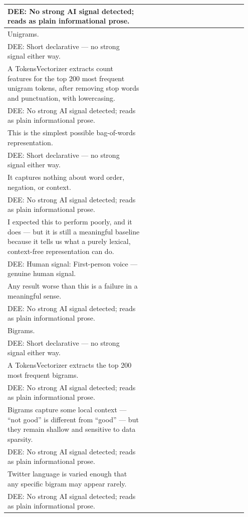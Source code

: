 \documentclass[11pt]{article}
\begin{document}
\begin{longtable}{|p{0.55\linewidth}|p{0.40\linewidth}|}
\hline
DEE: No strong AI signal detected; reads as plain informational prose. & \\
\hline
Unigrams. & \\[2pt]
\hline
DEE: Short declarative --- no strong signal either way. & \\
\hline
A TokensVectorizer extracts count features for the top 200 most frequent unigram tokens, after removing stop words and punctuation, with lowercasing. & \\[2pt]
\hline
DEE: No strong AI signal detected; reads as plain informational prose. & \\
\hline
This is the simplest possible bag-of-words representation. & \\[2pt]
\hline
DEE: Short declarative --- no strong signal either way. & \\
\hline
It captures nothing about word order, negation, or context. & \\[2pt]
\hline
DEE: No strong AI signal detected; reads as plain informational prose. & \\
\hline
I expected this to perform poorly, and it does --- but it is still a meaningful baseline because it tells us what a purely lexical, context-free representation can do. & \\[2pt]
\hline
DEE: Human signal: First-person voice --- genuine human signal. & \\
\hline
Any result worse than this is a failure in a meaningful sense. & \\[2pt]
\hline
DEE: No strong AI signal detected; reads as plain informational prose. & \\
\hline
Bigrams. & \\[2pt]
\hline
DEE: Short declarative --- no strong signal either way. & \\
\hline
A TokensVectorizer extracts the top 200 most frequent bigrams. & \\[2pt]
\hline
DEE: No strong AI signal detected; reads as plain informational prose. & \\
\hline
Bigrams capture some local context --- ``not good'' is different from ``good'' --- but they remain shallow and sensitive to data sparsity. & \\[2pt]
\hline
DEE: No strong AI signal detected; reads as plain informational prose. & \\
\hline
Twitter language is varied enough that any specific bigram may appear rarely. & \\[2pt]
\hline
DEE: No strong AI signal detected; reads as plain informational prose. & \\

\end{longtable}
\end{document}
